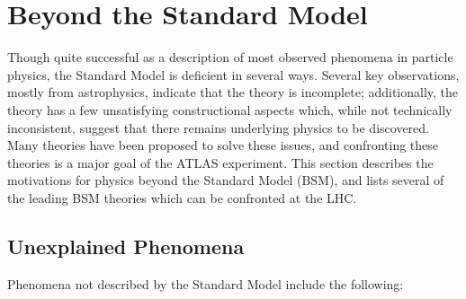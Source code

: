


\section{Beyond the Standard Model}\label{sec:beyond-the-standard-model}
Though quite successful as a description of most observed phenomena in particle physics, the Standard Model is deficient in several ways. Several key observations, mostly from astrophysics, indicate that the theory is incomplete; additionally, the theory has a few unsatisfying constructional aspects which, while not technically inconsistent, suggest that there remains underlying physics to be discovered. Many theories have been proposed to solve these issues, and confronting these theories is a major goal of the ATLAS experiment. This section describes the motivations for physics beyond the Standard Model (BSM), and lists several of the leading BSM theories which can be confronted at the LHC.

\subsection{Unexplained Phenomena}\label{sec:bsm-unexplained-phenomena}

Phenomena not described by the Standard Model include the following:

